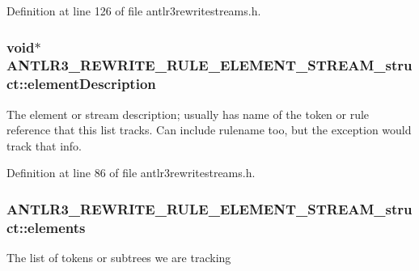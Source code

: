 Definition at line 126 of file antlr3rewritestreams.\-h.

\hypertarget{struct_a_n_t_l_r3___r_e_w_r_i_t_e___r_u_l_e___e_l_e_m_e_n_t___s_t_r_e_a_m__struct_a0902e14cb0c4ce49537d9c06176acb8f}{
\subsubsection[{element\-Description}]{\setlength{\rightskip}{0pt plus 5cm}void$\ast$ A\-N\-T\-L\-R3\-\_\-\-R\-E\-W\-R\-I\-T\-E\-\_\-\-R\-U\-L\-E\-\_\-\-E\-L\-E\-M\-E\-N\-T\-\_\-\-S\-T\-R\-E\-A\-M\-\_\-struct\-::element\-Description}}\label{struct_a_n_t_l_r3___r_e_w_r_i_t_e___r_u_l_e___e_l_e_m_e_n_t___s_t_r_e_a_m__struct_a0902e14cb0c4ce49537d9c06176acb8f}
The element or stream description; usually has name of the token or rule reference that this list tracks. Can include rulename too, but the exception would track that info. 

Definition at line 86 of file antlr3rewritestreams.\-h.

\hypertarget{struct_a_n_t_l_r3___r_e_w_r_i_t_e___r_u_l_e___e_l_e_m_e_n_t___s_t_r_e_a_m__struct_a5f5e056ea19406a056138bb2db3e1396}{
\subsubsection[{elements}]{ A\-N\-T\-L\-R3\-\_\-\-R\-E\-W\-R\-I\-T\-E\-\_\-\-R\-U\-L\-E\-\_\-\-E\-L\-E\-M\-E\-N\-T\-\_\-\-S\-T\-R\-E\-A\-M\-\_\-struct\-::elements}}\label{struct_a_n_t_l_r3___r_e_w_r_i_t_e___r_u_l_e___e_l_e_m_e_n_t___s_t_r_e_a_m__struct_a5f5e056ea19406a056138bb2db3e1396}
The list of tokens or subtrees we are tracking 

